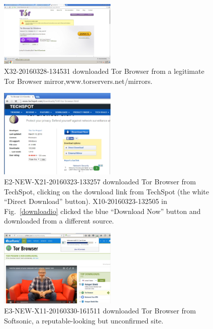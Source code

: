 \documentclass[USenglish,oneside,twocolumn]{article}
\begin{document}
\begin{figure}[h]
\label{mirror}
\includegraphics[width=0.5\textwidth]{../experiment/processing/bad-participants/X32-20160328-134531-mirror.png}
\caption{X32-20160328-134531 downloaded Tor Browser from a legitimate Tor Browser mirror,www.torservers.net/mirrors.}
\end{figure}

\begin{figure}[h]
\label{techspot}
\includegraphics[width=0.5\textwidth]{../experiment/processing/bad-participants/20160323-133257-techspot.png}
\caption{E2-NEW-X21-20160323-133257 downloaded Tor Browser from TechSpot, clicking on the download link from 
TechSpot (the white ``Direct Download'' button). X10-20160323-132505 in Fig.~\ref{downloadio} clicked the blue ``Download Now'' button and downloaded from a different source.}
\end{figure}

\begin{figure}[h]
\label{softsonic}
\includegraphics[width=0.5\textwidth]{../experiment/processing/bad-participants/20160330-161511-softsonic.png}
\caption{E3-NEW-X11-20160330-161511 downloaded Tor Browser from Softsonic, a reputable-looking but
unconfirmed site.}
\end{figure}
\end{document}
